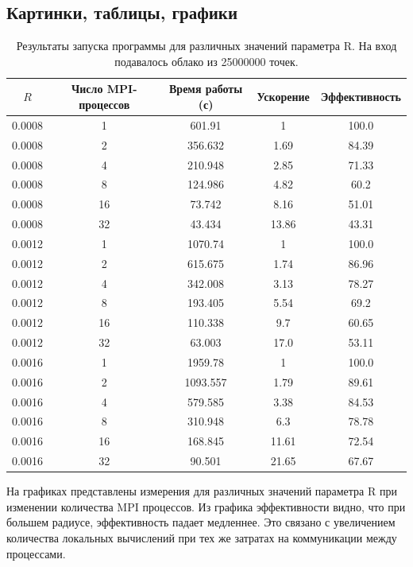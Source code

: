 \clearpage
\subsection{Картинки, таблицы, графики}

\begin{table}[h]
\begin{tabular}{|c|c|c|c|c|}
    \hline
    $R$ & Число MPI-процессов & Время работы (с) & Ускорение & Эффективность \\
    \hline
    0.0008 & 1 & 601.91  &  1  &  100.0 \\
    0.0008 & 2 & 356.632  &  1.69  &  84.39 \\
    0.0008 & 4 & 210.948  &  2.85  &  71.33 \\
    0.0008 & 8 & 124.986  &  4.82  &  60.2 \\
    0.0008 & 16 & 73.742  &  8.16  &  51.01 \\
    0.0008 & 32 & 43.434  &  13.86  &  43.31 \\
    \hline
    0.0012 &  1  &  1070.74  &  1  &  100.0 \\
    0.0012 &  2  &  615.675  &  1.74  &  86.96 \\
    0.0012 &  4  &  342.008  &  3.13  &  78.27 \\
    0.0012 &  8  &  193.405  &  5.54  &  69.2 \\
    0.0012 &  16  &  110.338  &  9.7  &  60.65 \\
    0.0012 &  32  &  63.003  &  17.0  &  53.11 \\
    \hline
    0.0016 &  1  &  1959.78  &  1  &  100.0 \\
    0.0016 &  2  &  1093.557  &  1.79  &  89.61 \\
    0.0016 &  4  &  579.585  &  3.38  &  84.53 \\
    0.0016 &  8  &  310.948  &  6.3  &  78.78 \\
    0.0016 &  16  &  168.845  &  11.61  &  72.54 \\
    0.0016 &  32  &  90.501  &  21.65  &  67.67 \\
    \hline
\end{tabular}
\caption{Результаты запуска программы для различных значений параметра R. На вход подавалось облако из 25000000 точек.}
\label{table:1}
\end{table}

На графиках представлены измерения для различных значений параметра R при изменении количества MPI процессов. Из графика эффективности видно, что при большем радиусе, эффективность падает медленнее. Это связано с увеличением количества локальных вычислений при тех же затратах на коммуникации между процессами.


